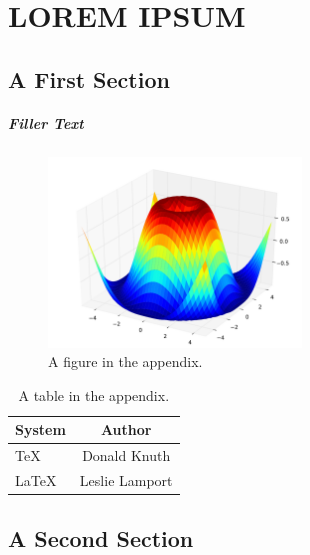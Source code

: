 \chapter{LOREM IPSUM}

\section{A First Section}

\paragraph{Filler Text} \lipsum[1-6]
%
\begin{figure}
  \centeringgm
  \includegraphics[width=0.6\textwidth]{Chapter-2/figs/threed}
  \caption{A figure in the appendix.}
  \label{fig:app}
\end{figure}
%
\lipsum[7-10]
\begin{table}
  \caption{A table in the appendix.}
  \label{tab:app}
  \begin{center}
    \begin{tabular}{lc}
      \toprule
      System & Author \\
      \midrule
      \TeX   & Donald Knuth   \\
      \LaTeX & Leslie Lamport \\
      \bottomrule
    \end{tabular}
  \end{center}
\end{table}
%

\section{A Second Section}

\lipsum[14-15]
